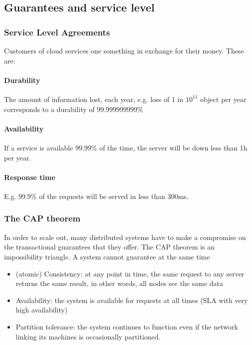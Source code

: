 \subsection{Guarantees and service level}

\subsubsection{Service Level Agreements}

Customers of cloud services one something in exchange for their money. These are:

\paragraph{Durability} The amount of information lost, each year, e.g. loss of 1 in $10^{11}$ object per year corresponds to a durability of $99.999999999\%$

\paragraph{Availability} If a service is available $99.99\%$ of the time, the server will be down less than 1h per year.

\paragraph{Response time} E.g. 99.9\% of the requests will be served in less than 300ms.


\subsubsection{The CAP theorem}

In order to scale out, many distributed systems have to make a compromise on the transactional guarantees that they offer. The CAP theorem is an impossibility triangle. A system cannot guarantee at the same time
\begin{itemize}
    \item (atomic) Consistency: at any point in time, the same request to any server returns the same result, in other words, all nodes see the same data
    \item Availability: the system is available for requests at all times (SLA with very high availability)
    \item Partition tolerance: the system continues to function even if the network linking its machines is occasionally partitioned.
\end{itemize}

